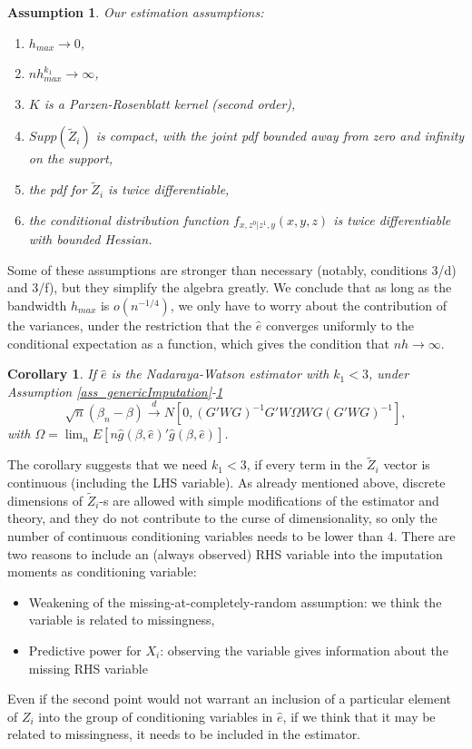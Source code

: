 \documentclass{article}
\newtheorem{assumption}{Assumption}
\newtheorem{corollary}{Corollary}
\theoremstyle{definition}
\theoremstyle{remark}
\begin{document}
\begin{assumption}\label{ass_estimation}
    Our estimation assumptions:
    \begin{enumerate}
        \item[a)] $h_{max}\rightarrow 0$,
        \item[b)] $nh_{max}^{k_1}\rightarrow \infty$,
        \item[c)] $K$ is a Parzen-Rosenblatt kernel (second order),
        \item[d)] $Supp(\tilde{Z}_i)$ is compact, with the joint pdf bounded away from zero and infinity on the support,
        \item[e)] the pdf for $\tilde{Z}_i$ is twice differentiable,
        \item[f)] the conditional distribution function $f_{x, z^0|z^1, y}(x, y,z)$ is twice differentiable with bounded Hessian.
    \end{enumerate}
\end{assumption}
Some of these assumptions are stronger than necessary (notably, conditions 3/d) and 3/f), but they simplify the algebra greatly. We conclude that as long as the bandwidth $h_{max}$ is $o(n^{-1/4})$, we only have to worry about the contribution of the variances, under the restriction that the $\hat{e}$ converges uniformly to the conditional expectation as a function, which gives the condition that $nh \rightarrow \infty$.
\begin{corollary}\label{cor_NWTheory}
	If $\hat{e}$ is the Nadaraya-Watson estimator with $k_1<3$, under Assumption \ref{ass_genericImputation}-\ref{ass_estimation}
		\[\sqrt{n}(\beta_n-\beta) \stackrel{d}{\rightarrow} N[0, (G'WG)^{-1}G'W \Omega W G (G'WG)^{-1}],
		\]
	with $\Omega= \lim_n E[n\hat{g}(\beta, \hat{e})'\hat{g}(\beta, \hat{e})]$. 
\end{corollary}
The corollary suggests that we need $k_1<3$, if every term in the $\tilde{Z}_i$ vector is continuous (including the LHS variable). As already mentioned above, discrete dimensions of $\tilde{Z}_i$-s are allowed with simple modifications of the estimator and theory, and they do not contribute to the curse of dimensionality, so only the number of continuous conditioning variables needs to be lower than 4. There are two reasons to include an (always observed) RHS variable into the imputation moments as conditioning variable:
\begin{itemize}
	\item Weakening of the missing-at-completely-random assumption: we think the variable is related to missingness,
	\item Predictive power for $X_i$: observing the variable gives information about the missing RHS variable
\end{itemize}
Even if the second point would not warrant an inclusion of a particular element of $Z_i$ into the group of conditioning variables in $\hat{e}$, if we think that it may be related to missingness, it needs to be included in the estimator.
\end{document}
